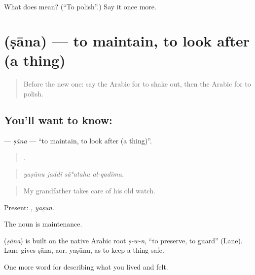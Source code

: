 \begin{tcolorbox}[breakable,colback=teal!4,colframe=teal!35!black,title={Before you move on}]
What does  mean? (\textquotedblleft{}To polish\textquotedblright{}.) Say it once more.
\end{tcolorbox}
\section[\texorpdfstring{\ar{صان} (ṣāna)}{صان (ṣāna)}]{ (ṣāna) — to maintain, to look after (a thing)}

\label{lesson:AR-C550-sana}



\begin{quote}
Before the new one: say the Arabic for to shake out, then the Arabic for to polish.
\end{quote}

\subsection*{You'll want to know: }
\textbf{} — \emph{ṣāna} — \textquotedblleft{}to maintain, to look after (a thing)\textquotedblright{}.

\begin{quote}
   .
\end{quote}

\begin{quote}
\emph{yaṣūnu jaddī sāʿatahu al-qadīma.}
\end{quote}

\begin{quote}
My grandfather takes care of his old watch.
\end{quote}

Present: , \emph{yaṣūn}.

The noun  is maintenance.

\begin{cousinweb}
\textbf{} (\emph{ṣāna}) is built on the native Arabic root \emph{ṣ-w-n}, \textquotedblleft{}to preserve, to guard\textquotedblright{} (Lane). Lane gives ṣāna, aor. yaṣūnu, as to keep a thing safe.
\end{cousinweb}

\begin{grammarlens}[title={What you've built}]
One more word for describing what you lived and felt.
\end{grammarlens}

